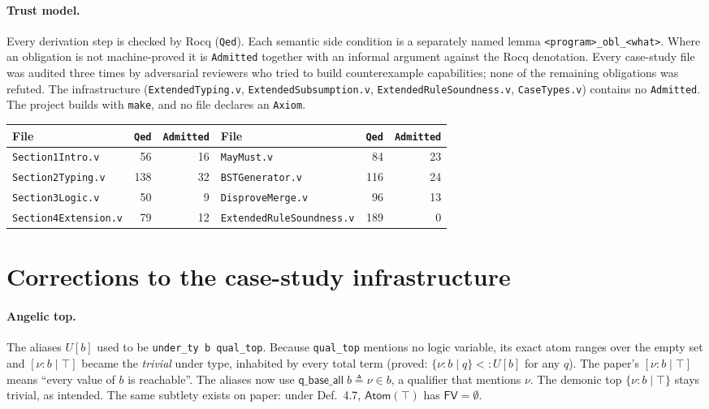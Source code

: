 \documentclass[10pt]{article}
\newcommand{\ov}[2]{\{\nu{:}#1 \mid #2\}}          %
\newcommand{\un}[2]{[\nu{:}#1 \mid #2]}            %
\newcommand{\sub}{\mathrel{<:}}
\newcommand{\rocq}[1]{\texttt{#1}}
\begin{document}
\paragraph{Trust model.} Every derivation step is checked by Rocq (\rocq{Qed}).
Each semantic side condition is a separately named lemma
\rocq{<program>\_obl\_<what>}. Where an obligation is not machine-proved it is
\rocq{Admitted} together with an informal argument against the Rocq denotation.
Every case-study file was audited three times by adversarial reviewers who
tried to build counterexample capabilities; none of the remaining obligations
was refuted. The infrastructure (\rocq{ExtendedTyping.v},
\rocq{ExtendedSubsumption.v}, \rocq{ExtendedRuleSoundness.v},
\rocq{CaseTypes.v}) contains no \rocq{Admitted}. The project builds with
\rocq{make}, and no file declares an \rocq{Axiom}.

\begin{center}\small
\begin{tabular}{lrr@{\qquad}lrr}
\toprule
File & \rocq{Qed} & \rocq{Admitted} & File & \rocq{Qed} & \rocq{Admitted}\\
\midrule
\rocq{Section1Intro.v} & 56 & 16 & \rocq{MayMust.v} & 84 & 23\\
\rocq{Section2Typing.v} & 138 & 32 & \rocq{BSTGenerator.v} & 116 & 24\\
\rocq{Section3Logic.v} & 50 & 9 & \rocq{DisproveMerge.v} & 96 & 13\\
\rocq{Section4Extension.v} & 79 & 12 & \rocq{ExtendedRuleSoundness.v} & 189 & 0\\
\bottomrule
\end{tabular}
\end{center}

\section{Corrections to the case-study infrastructure}

\paragraph{Angelic top.} The aliases $U[b]$ used to be
\rocq{under\_ty b qual\_top}. Because \rocq{qual\_top} mentions no logic
variable, its exact atom ranges over the empty set and $\un{b}{\top}$ became
the \emph{trivial} under type, inhabited by every total term (proved:
$\ov{b}{q}\sub U[b]$ for any $q$). The paper's $\un{b}{\top}$ means ``every value of
$b$ is reachable''. The aliases now use
$\textsf{q\_base\_all}\;b \triangleq \nu \in b$, a qualifier that mentions $\nu$.
The demonic top $\ov{b}{\top}$ stays trivial, as intended. The same subtlety
exists on paper: under Def.~4.7, $\mathsf{Atom}(\top)$ has $\mathsf{FV}=\emptyset$.
\end{document}
